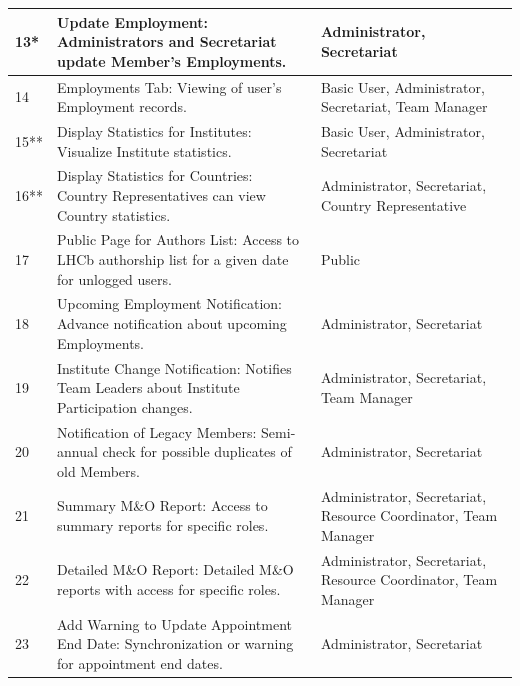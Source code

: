 \begin{longtable}{|p{}|p{}|p{}|}
\hline
13* & Update Employment: Administrators and Secretariat update Member's Employments. & Administrator, Secretariat \\
\hline
14 & Employments Tab: Viewing of user's Employment records. & Basic User, Administrator, Secretariat, Team Manager \\
\hline
15** & Display Statistics for Institutes: Visualize Institute statistics. & Basic User, Administrator, Secretariat \\
\hline
16** & Display Statistics for Countries: Country Representatives can view Country statistics. & Administrator, Secretariat, Country Representative \\
\hline
17 & Public Page for Authors List: Access to LHCb authorship list for a given date for unlogged users. & Public \\
\hline
18 & Upcoming Employment Notification: Advance notification about upcoming Employments. & Administrator, Secretariat \\
\hline
19 & Institute Change Notification: Notifies Team Leaders about Institute Participation changes. & Administrator, Secretariat, Team Manager \\
\hline
20 & Notification of Legacy Members: Semi-annual check for possible duplicates of old Members. & Administrator, Secretariat \\
\hline
21 & Summary M\&O Report: Access to summary reports for specific roles. & Administrator, Secretariat, Resource Coordinator, Team Manager \\
\hline
22 & Detailed M\&O Report: Detailed M\&O reports with access for specific roles. & Administrator, Secretariat, Resource Coordinator, Team Manager \\
\hline
23 & Add Warning to Update Appointment End Date: Synchronization or warning for appointment end dates. & Administrator, Secretariat \\
\hline

\end{longtable}

